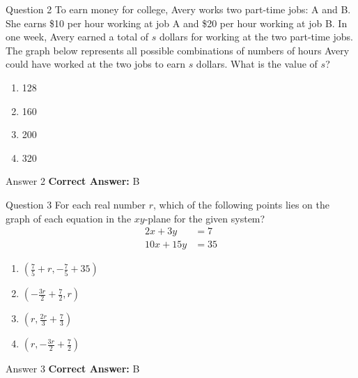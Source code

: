 \documentclass{beamer}
\begin{document}
\begin{frame}{Question 2}
\small
To earn money for college, Avery works two part-time jobs: A and B. She earns \$10 per hour working at job A and \$20 per hour working at job B. In one week, Avery earned a total of \( s \) dollars for working at the two part-time jobs. The graph below represents all possible combinations of numbers of hours Avery could have worked at the two jobs to earn \( s \) dollars. What is the value of \( s \)?

\begin{center}
\end{center}
\vspace{0.35cm}
\begin{enumerate}
    \item[A.] 128
    \item[B.] 160
    \item[C.] 200
    \item[D.] 320
\end{enumerate}
\end{frame}
\begin{frame}{Answer 2}
\small
\textbf{Correct Answer:} B
\end{frame}

\begin{frame}{Question 3}
\small
For each real number \( r \), which of the following points lies on the graph of each equation in the \( xy \)-plane for the given system?
\[
\begin{aligned}
2x + 3y &= 7 \\
10x + 15y &= 35
\end{aligned}
\]
\vspace{0.35cm}
\begin{enumerate}
    \item[A.] $\left(\frac{7}{5} + r, -\frac{7}{5} + 35 \right)$
    \item[B.] $\left(-\frac{3r}{2} + \frac{7}{2}, r \right)$
    \item[C.] $\left(r, \frac{2r}{3} + \frac{7}{3} \right)$
    \item[D.] $\left(r, -\frac{3r}{2} + \frac{7}{2} \right)$
\end{enumerate}
\end{frame}
\begin{frame}{Answer 3}
\small
\textbf{Correct Answer:} B
\end{frame}
\end{document}
